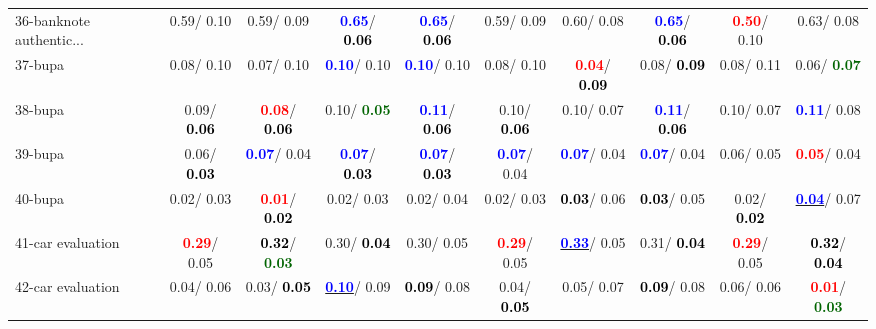 \begin{table}[h]
\begin{center}
{\begin{tabular}{lc|c|c|c|c|c|c|c|c}
36-banknote authentic... &   0.59/  0.10 &   0.59/  0.09 & \textcolor{blue}{\textbf{  0.65}}/\textcolor{black}{\textbf{  0.06}} & \textcolor{blue}{\textbf{  0.65}}/\textcolor{black}{\textbf{  0.06}} &   0.59/  0.09 &   0.60/  0.08 & \textcolor{blue}{\textbf{  0.65}}/\textcolor{black}{\textbf{  0.06}} & \textcolor{red}{\textbf{  0.50}}/  0.10 &   0.63/  0.08 \\
37-bupa &   0.08/  0.10 &   0.07/  0.10 & \textcolor{blue}{\textbf{  0.10}}/  0.10 & \textcolor{blue}{\textbf{  0.10}}/  0.10 &   0.08/  0.10 & \textcolor{red}{\textbf{  0.04}}/\textcolor{black}{\textbf{  0.09}} &   0.08/\textcolor{black}{\textbf{  0.09}} &   0.08/  0.11 &   0.06/\textcolor{darkgreen}{\textbf{  0.07}} \\
38-bupa &   0.09/\textcolor{black}{\textbf{  0.06}} & \textcolor{red}{\textbf{  0.08}}/\textcolor{black}{\textbf{  0.06}} &   0.10/\textcolor{darkgreen}{\textbf{  0.05}} & \textcolor{blue}{\textbf{  0.11}}/\textcolor{black}{\textbf{  0.06}} &   0.10/\textcolor{black}{\textbf{  0.06}} &   0.10/  0.07 & \textcolor{blue}{\textbf{  0.11}}/\textcolor{black}{\textbf{  0.06}} &   0.10/  0.07 & \textcolor{blue}{\textbf{  0.11}}/  0.08 \\
39-bupa &   0.06/\textcolor{black}{\textbf{  0.03}} & \textcolor{blue}{\textbf{  0.07}}/  0.04 & \textcolor{blue}{\textbf{  0.07}}/\textcolor{black}{\textbf{  0.03}} & \textcolor{blue}{\textbf{  0.07}}/\textcolor{black}{\textbf{  0.03}} & \textcolor{blue}{\textbf{  0.07}}/  0.04 & \textcolor{blue}{\textbf{  0.07}}/  0.04 & \textcolor{blue}{\textbf{  0.07}}/  0.04 &   0.06/  0.05 & \textcolor{red}{\textbf{  0.05}}/  0.04 \\ \hline
40-bupa &   0.02/  0.03 & \textcolor{red}{\textbf{  0.01}}/\textcolor{black}{\textbf{  0.02}} &   0.02/  0.03 &   0.02/  0.04 &   0.02/  0.03 & \textcolor{black}{\textbf{  0.03}}/  0.06 & \textcolor{black}{\textbf{  0.03}}/  0.05 &   0.02/\textcolor{black}{\textbf{  0.02}} & \underline{\textcolor{blue}{\textbf{  0.04}}}/  0.07 \\
41-car evaluation & \textcolor{red}{\textbf{  0.29}}/  0.05 & \textcolor{black}{\textbf{  0.32}}/\textcolor{darkgreen}{\textbf{  0.03}} &   0.30/\textcolor{black}{\textbf{  0.04}} &   0.30/  0.05 & \textcolor{red}{\textbf{  0.29}}/  0.05 & \underline{\textcolor{blue}{\textbf{  0.33}}}/  0.05 &   0.31/\textcolor{black}{\textbf{  0.04}} & \textcolor{red}{\textbf{  0.29}}/  0.05 & \textcolor{black}{\textbf{  0.32}}/\textcolor{black}{\textbf{  0.04}} \\
42-car evaluation &   0.04/  0.06 &   0.03/\textcolor{black}{\textbf{  0.05}} & \underline{\textcolor{blue}{\textbf{  0.10}}}/  0.09 & \textcolor{black}{\textbf{  0.09}}/  0.08 &   0.04/\textcolor{black}{\textbf{  0.05}} &   0.05/  0.07 & \textcolor{black}{\textbf{  0.09}}/  0.08 &   0.06/  0.06 & \textcolor{red}{\textbf{  0.01}}/\textcolor{darkgreen}{\textbf{  0.03}} \\

\end{tabular}}
\end{center}
\end{table}
